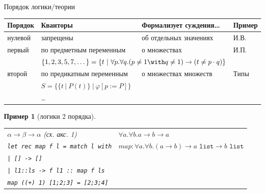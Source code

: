 \documentclass[aspectratio=169]{beamer}
\newtheorem{exm}{Пример}[section]
\begin{document}
\begin{frame}{Порядок логики/теории}
\begin{tabular}{llll}
Порядок & Кванторы & Формализует суждения\dots & Пример\\\hline
нулевой & запрещены & об отдельных значениях & И.В.\\
первый & по предметным переменным & о множествах & И.П.\\
    &   \multicolumn{2}{l}{\color{olive}$\{1,2,3,5,7,\dots\} = \{ t\ |\ \forall p.\forall q.(p \ne 1 \with q \ne 1) \rightarrow (t \ne p\cdot q)\}$}\\
второй & по предикатным переменным & о множествах множеств & Типы\\
    &   \multicolumn{2}{l}{\color{olive}$S = \{ \{t\ |\ P(t)\}\ |\ \varphi[p := P] \}$}\\
 & \dots 
\end{tabular}
\pause\vspace{0.3cm}

\begin{exm}[логики 2 порядка]\upshape
\begin{tabular}{ll}
$\alpha\rightarrow\beta\rightarrow\alpha$ (сх. акс. 1) & $\forall a.\forall b.a \rightarrow b \rightarrow a$ \vspace{0.1cm}\\
\texttt{let rec map f l = match l with} & $map: \forall a.\forall b.(a \rightarrow b) \rightarrow a\texttt{ list} \rightarrow b\texttt{ list}$ \\
\texttt{| [] -> []} \\
\texttt{| l1::ls -> f l1 :: map f ls}\vspace{0.1cm}\\
\texttt{map ((+) 1) [1;2;3] = [2;3;4]}
\end{tabular}
\end{exm}

\end{frame}
\end{document}
